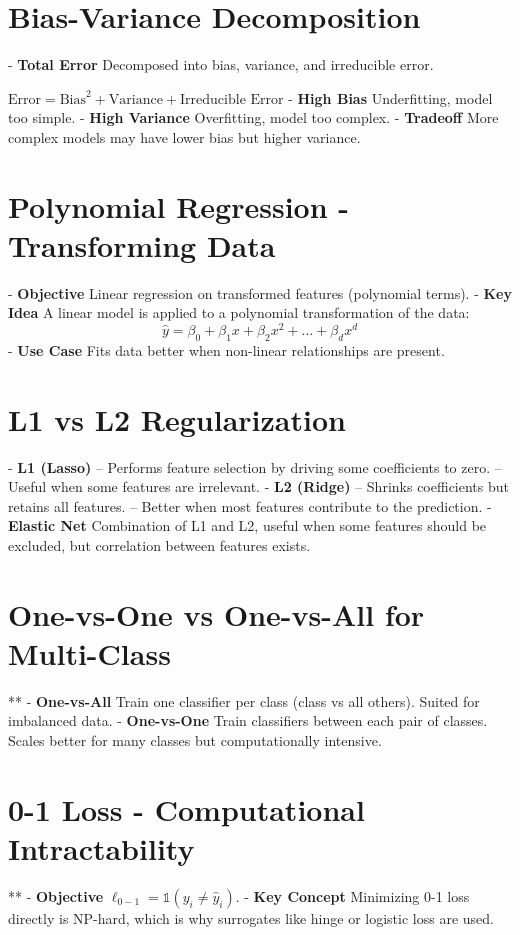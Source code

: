 \documentclass[10pt]{article}
\begin{document}
\begin{multicols}{2}
\section*{Bias-Variance Decomposition}
- \textbf{Total Error} Decomposed into bias, variance, and irreducible error.
  
  $\text{Error} = \text{Bias}^2 + \text{Variance} + \text{Irreducible Error}$
- \textbf{High Bias} Underfitting, model too simple.
- \textbf{High Variance} Overfitting, model too complex.
- \textbf{Tradeoff} More complex models may have lower bias but higher variance.

\section*{Polynomial Regression - Transforming Data}
- \textbf{Objective} Linear regression on transformed features (polynomial terms).
- \textbf{Key Idea} A linear model is applied to a polynomial transformation of the data:
  \[
  \hat{y} = \beta_0 + \beta_1 x + \beta_2 x^2 + \dots + \beta_d x^d
  \]
- \textbf{Use Case} Fits data better when non-linear relationships are present.

\section*{L1 vs L2 Regularization}
- \textbf{L1 (Lasso)}
-- Performs feature selection by driving some coefficients to zero.
-- Useful when some features are irrelevant.
- \textbf{L2 (Ridge)}
-- Shrinks coefficients but retains all features.
-- Better when most features contribute to the prediction.
- \textbf{Elastic Net} Combination of L1 and L2, useful when some features should be excluded, but correlation between features exists.

\section*{One-vs-One vs One-vs-All for Multi-Class}**
- \textbf{One-vs-All} Train one classifier per class (class vs all others). Suited for imbalanced data.
- \textbf{One-vs-One} Train classifiers between each pair of classes. Scales better for many classes but computationally intensive.

\section*{0-1 Loss - Computational Intractability}**
- \textbf{Objective} $\ell_{0-1} = \mathbb{1}(y_i \neq \hat{y}_i)$.
- \textbf{Key Concept} Minimizing 0-1 loss directly is NP-hard, which is why surrogates like hinge or logistic loss are used.


\end{multicols}
\end{document}
